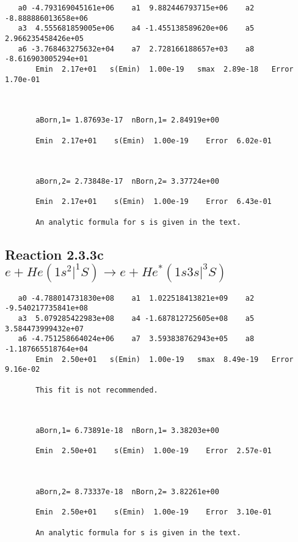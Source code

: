 \documentclass[12pt]{article}
\begin{document}
\begin{small}\begin{verbatim}
   a0 -4.793169045161e+06    a1  9.882446793715e+06    a2 -8.888886013658e+06
   a3  4.555681859005e+06    a4 -1.455138589620e+06    a5  2.966235458426e+05
   a6 -3.768463275632e+04    a7  2.728166188657e+03    a8 -8.616903005294e+01
       Emin  2.17e+01   s(Emin)  1.00e-19   smax  2.89e-18   Error  1.70e-01



       aBorn,1= 1.87693e-17  nBorn,1= 2.84919e+00

       Emin  2.17e+01    s(Emin)  1.00e-19    Error  6.02e-01



       aBorn,2= 2.73848e-17  nBorn,2= 3.37724e+00

       Emin  2.17e+01    s(Emin)  1.00e-19    Error  6.43e-01

       An analytic formula for s is given in the text.
\end{verbatim}\end{small}





\newpage
\subsection{
Reaction 2.3.3c $e + He(1s^2|^1S) \rightarrow e + He^*(1s3s|^3S)$}

















\begin{small}\begin{verbatim}
   a0 -4.788014731830e+08    a1  1.022518413821e+09    a2 -9.540217735841e+08
   a3  5.079285422983e+08    a4 -1.687812725605e+08    a5  3.584473999432e+07
   a6 -4.751258664024e+06    a7  3.593838762943e+05    a8 -1.187665518764e+04
       Emin  2.50e+01   s(Emin)  1.00e-19   smax  8.49e-19   Error  9.16e-02

       This fit is not recommended.



       aBorn,1= 6.73891e-18  nBorn,1= 3.38203e+00

       Emin  2.50e+01    s(Emin)  1.00e-19    Error  2.57e-01



       aBorn,2= 8.73337e-18  nBorn,2= 3.82261e+00

       Emin  2.50e+01    s(Emin)  1.00e-19    Error  3.10e-01

       An analytic formula for s is given in the text.
\end{verbatim}\end{small}
\end{document}

